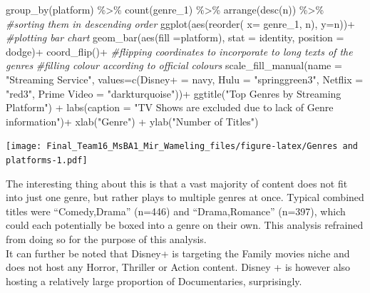 \documentclass[
]{article}
\newenvironment{Shaded}{\begin{snugshade}}{\end{snugshade}}
\newcommand{\AttributeTok}[1]{\textcolor[rgb]{0.77,0.63,0.00}{#1}}
\newcommand{\CommentTok}[1]{\textcolor[rgb]{0.56,0.35,0.01}{\textit{#1}}}
\newcommand{\FunctionTok}[1]{\textcolor[rgb]{0.00,0.00,0.00}{#1}}
\newcommand{\NormalTok}[1]{#1}
\newcommand{\OtherTok}[1]{\textcolor[rgb]{0.56,0.35,0.01}{#1}}
\newcommand{\SpecialCharTok}[1]{\textcolor[rgb]{0.00,0.00,0.00}{#1}}
\newcommand{\StringTok}[1]{\textcolor[rgb]{0.31,0.60,0.02}{#1}}
\begin{document}
\begin{Shaded}
\begin{Highlighting}[]
  \FunctionTok{group\_by}\NormalTok{(platform) }\SpecialCharTok{\%\textgreater{}\%} 
  \FunctionTok{count}\NormalTok{(genre\_1) }\SpecialCharTok{\%\textgreater{}\%} 
  \FunctionTok{arrange}\NormalTok{(}\FunctionTok{desc}\NormalTok{(n)) }\SpecialCharTok{\%\textgreater{}\%} \CommentTok{\#sorting them in descending order}
  \FunctionTok{ggplot}\NormalTok{(}\FunctionTok{aes}\NormalTok{(}\FunctionTok{reorder}\NormalTok{( }\AttributeTok{x=}\NormalTok{ genre\_1, n), }\AttributeTok{y=}\NormalTok{n))}\SpecialCharTok{+}
  \CommentTok{\#plotting bar chart}
  \FunctionTok{geom\_bar}\NormalTok{(}\FunctionTok{aes}\NormalTok{(}\AttributeTok{fill =}\NormalTok{platform), }\AttributeTok{stat =} \StringTok{\textquotesingle{}identity\textquotesingle{}}\NormalTok{, }\AttributeTok{position =} \StringTok{\textquotesingle{}dodge\textquotesingle{}}\NormalTok{)}\SpecialCharTok{+}
  \FunctionTok{coord\_flip}\NormalTok{()}\SpecialCharTok{+} \CommentTok{\#flipping coordinates to incorporate to long texts of the genres}
  \CommentTok{\#filling colour according to official colours}
  \FunctionTok{scale\_fill\_manual}\NormalTok{(}\AttributeTok{name =} \StringTok{"Streaming Service"}\NormalTok{, }\AttributeTok{values=}\FunctionTok{c}\NormalTok{(}\StringTok{\textasciigrave{}}\AttributeTok{Disney+}\StringTok{\textasciigrave{}} \OtherTok{=} \StringTok{\textquotesingle{}navy\textquotesingle{}}\NormalTok{, }\StringTok{\textasciigrave{}}\AttributeTok{Hulu}\StringTok{\textasciigrave{}} \OtherTok{=} \StringTok{"springgreen3"}\NormalTok{, }\StringTok{\textasciigrave{}}\AttributeTok{Netflix}\StringTok{\textasciigrave{}} \OtherTok{=} \StringTok{"red3"}\NormalTok{, }\StringTok{\textasciigrave{}}\AttributeTok{Prime Video}\StringTok{\textasciigrave{}} \OtherTok{=} \StringTok{"darkturquoise"}\NormalTok{))}\SpecialCharTok{+}
  \FunctionTok{ggtitle}\NormalTok{(}\StringTok{"Top Genres by Streaming Platform"}\NormalTok{) }\SpecialCharTok{+}
  \FunctionTok{labs}\NormalTok{(}\AttributeTok{caption =} \StringTok{"TV Shows are excluded due to lack of Genre information"}\NormalTok{)}\SpecialCharTok{+}
  \FunctionTok{xlab}\NormalTok{(}\StringTok{"Genre"}\NormalTok{) }\SpecialCharTok{+} \FunctionTok{ylab}\NormalTok{(}\StringTok{"Number of Titles"}\NormalTok{)}
\end{Highlighting}
\end{Shaded}

\texttt{[image: Final\_Team16\_MsBA1\_Mir\_Wameling\_files/figure-latex/Genres and platforms-1.pdf]}

The interesting thing about this is that a vast majority of content does
not fit into just one genre, but rather plays to multiple genres at
once. Typical combined titles were ``Comedy,Drama'' (n=446) and
``Drama,Romance'' (n=397), which could each potentially be boxed into a
genre on their own. This analysis refrained from doing so for the
purpose of this analysis.\\
It can further be noted that Disney+ is targeting the Family movies
niche and does not host any Horror, Thriller or Action content. Disney +
is however also hosting a relatively large proportion of Documentaries,
surprisingly.
\end{document}
